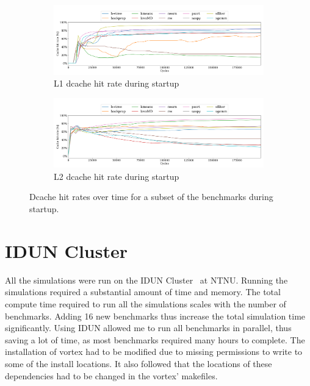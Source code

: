 \begin{figure}
    \centering
    \begin{subfigure}[t]{\textwidth}
        \centering
        \includegraphics[width=\textwidth]{figures/L1cachehit_vlsim.png}
        \caption{L1 dcache hit rate during startup}
        \label{fig:l1_cache_startup_hitrate}
    \end{subfigure}
    \hfill
    \begin{subfigure}[t]{\textwidth}
        \centering
        \includegraphics[width=\textwidth]{figures/L2cachehit_vlsim.png}
        \caption{L2 dcache hit rate during startup}
        \label{fig:l2_cache_startup_hitrate}
    \end{subfigure}
    \caption[Dcache hit rates over time during startup.]{Dcache hit rates over time for a subset of the benchmarks during startup.}
    \label{fig:dcache_startup_hitrate}
\end{figure}

\section{IDUN Cluster}

All the simulations were run on the IDUN Cluster~\cite{Idun_tech_report} at NTNU. Running the simulations required a substantial amount of time and memory. The total compute time required to run all the simulations scales with the number of benchmarks. Adding 16 new benchmarks thus increase the total simulation time significantly. Using IDUN allowed me to run all benchmarks in parallel, thus saving a lot of time, as most benchmarks required many hours to complete.
\newpage
The installation of \Gls{vortex} had to be modified due to missing permissions to write to some of the install locations. It also followed that the locations of these dependencies had to be changed in the \Gls{vortex}' makefiles.

